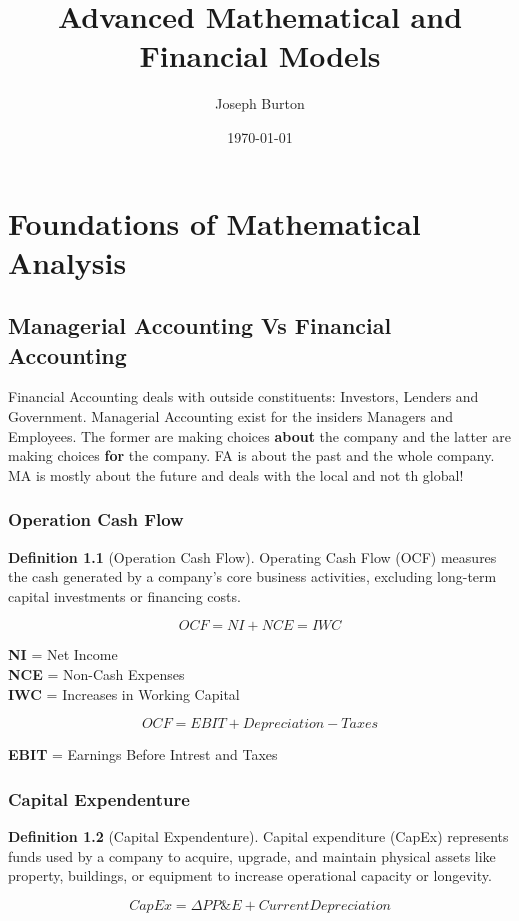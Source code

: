 \documentclass[12pt]{report}
\title{Advanced Mathematical and Financial Models}
\author{Joseph Burton}
\date{\today}
\numberwithin{equation}{chapter}
\theoremstyle{definition}
\newtheorem{definition}{Definition}[chapter]
\theoremstyle{plain}
\theoremstyle{remark}
\begin{document}
\maketitle
\tableofcontents
\newpage

\chapter{Foundations of Mathematical Analysis}

\section{Managerial Accounting Vs Financial Accounting}

Financial Accounting deals with outside constituents: Investors, Lenders and
Government. Managerial Accounting exist for the insiders Managers and
Employees. The former are making choices \textbf{about} the company and the
latter are making choices \textbf{for} the company. FA is about the past and
the whole company. MA is mostly about the future and deals with the local and
not th global!

\subsection{Operation Cash Flow}
\begin{definition}[Operation Cash Flow]
    Operating Cash Flow (OCF) measures the cash generated by a company's core business activities,
    excluding long-term capital investments or financing costs.

    \[ OCF = NI + NCE = IWC\]

    \textbf{NI} = Net Income \\
    \textbf{NCE} = Non-Cash Expenses \\
    \textbf{IWC} = Increases in Working Capital

    \[ OCF = EBIT + Depreciation - Taxes \]

    \textbf{EBIT} = Earnings Before Intrest and Taxes
\end{definition}

\subsection{Capital Expendenture}
\begin{definition}[Capital Expendenture]
    Capital expenditure (CapEx) represents funds used by a company to acquire, upgrade, and maintain physical assets
    like property, buildings, or equipment to increase operational capacity or longevity.

    \[ CapEx = \Delta PP\&E + Current Depreciation  \]
\end{definition}
\end{document}
